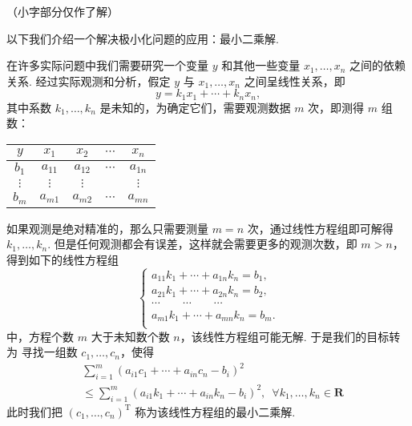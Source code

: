 {
    \footnotesize
    （小字部分仅作了解）

    以下我们介绍一个解决极小化问题的应用：最小二乘解.

    在许多实际问题中我们需要研究一个变量 $ y $ 和其他一些变量 $ x_1, \ldots , x_n $
    之间的依赖关系. 经过实际观测和分析，假定 $ y $ 与 $ x_1, \ldots , x_n $ 之间呈线性关系，即
    \[ y = k_1 x_1 + \cdots + k_n x_n, \]
    其中系数 $ k_1, \ldots , k_n $ 是未知的，为确定它们，需要观测数据 $ m $ 次，即测得 $ m $ 组数：
    \begin{center}
        \begin{tabular}{ccccc}
            $ y $ & $ x_1 $ & $ x_2 $ & $ \cdots $ & $ x_n $ \\
            \hline
            $ b_1 $ & $ a_{11} $ & $ a_{12} $ & $ \cdots $ & $ a_{1n}$ \\
            $ \vdots $ & $ \vdots $ & $ \vdots $ &  & $ \vdots $ \\
            $ b_m $ & $ a_{m1} $ & $ a_{m2} $ & $ \cdots $ & $ a_{mn}$ 
        \end{tabular}
    \end{center}
    如果观测是绝对精准的，那么只需要测量 $ m = n $ 次，通过线性方程组即可解得 $ k_1, \ldots , k_n $. 
    但是任何观测都会有误差，这样就会需要更多的观测次数，即 $ m > n $，得到如下的线性方程组
    \[
    \begin{cases}
        a_{11}k_1 + \cdots + a_{1n}k_n = b_1, \\
        a_{21}k_1 + \cdots + a_{2n}k_n = b_2, \\
        \cdots \qquad \cdots \qquad \cdots \\
        a_{m1}k_1 + \cdots + a_{mn}k_n = b_m.  \\
    \end{cases}
    \]
    中，方程个数 $ m $ 大于未知数个数 $ n $，该线性方程组可能无解. 于是我们的目标转为
    寻找一组数 $ c_1, \ldots , c_n $，使得
    \begin{align*}
         & \sum _{ i = 1 }^{m} (a_{i1}c_1 + \cdots  + a_{in}c_n - b_i )^{2} \\
         & \leqslant \sum _{ i = 1 }^{m} (a_{i1}k_1 + \cdots  + a_{in}k_n - b_i )^{2}, \enspace \forall k_1, \ldots , k_n \in \mathbf{R}
    \end{align*}
    此时我们把 $ (c_1, \ldots , c_n)^{\mathrm{T}} $ 称为该线性方程组的最小二乘解. 

}
